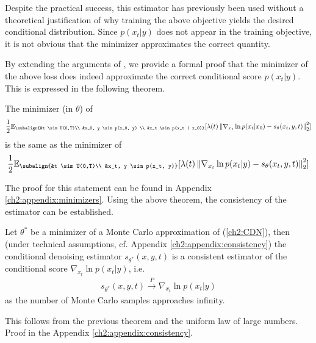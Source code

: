 Despite the practical success, this estimator has previously been used without a theoretical justification of why training the above objective yields the desired conditional distribution. Since $p(x_t|y)$ does not appear in the training objective, it is not obvious that the minimizer approximates the correct quantity. 

By extending the arguments of \cite{vincent2011connection}, we provide a formal proof that the minimizer of the above loss does indeed approximate the correct conditional score $p(x_t|y)$. This is expressed in the following theorem.

\begin{theorem}
    \label{ch2:thm:CDE_consistency}
    The minimizer (in $\theta$) of
    \begin{gather*}
    \begin{aligned}
            \frac{1}{2} \mathbb{E}_{\subalign{&t \sim U(0,T)\\ &x_0, y \sim p(x_0, y) \\ &x_t \sim p(x_t | x_0)}} 
            [\lambda(t) \norm{\nabla_{x_t} \ln{p(x_t | x_0)} - s_\theta(x_t, y, t)}_2^2]
    \end{aligned}
    \end{gather*}    
    is the same as the minimizer of 
    \begin{gather*}
        \frac{1}{2} \mathbb{E}_{\subalign{&t \sim U(0,T)\\ &x_t, y \sim p(x_t, y)}} 
        [\lambda(t) \norm{\nabla_{x_t} \ln{p(x_t | y)} - s_\theta(x_t, y,t)}_2^2]
    \end{gather*}
\end{theorem}
\noindent
The proof for this statement can be found in Appendix \ref{ch2:appendix:minimizers}. 
Using the above theorem, the consistency of the estimator can be established.
\begin{corollary}
    Let $\theta^\ast$ be a minimizer of a Monte Carlo approximation of (\ref{ch2:CDN}), then (under technical assumptions, cf. Appendix \ref{ch2:appendix:consistency}) the conditional denoising estimator $s_{\theta^\ast}(x,y,t)$ is a consistent estimator of the conditional score $\nabla_{x_t} \ln p(x_t | y)$, i.e.
    \begin{gather*}
        s_{\theta^\ast}(x,y,t) \overset{P}{\to} \nabla_{x_t} \ln p(x_t | y)   
    \end{gather*}
    as the number of Monte Carlo samples approaches infinity.
\end{corollary}
\noindent
This follows from the previous theorem and the uniform law of large numbers. Proof in the Appendix \ref{ch2:appendix:consistency}.

